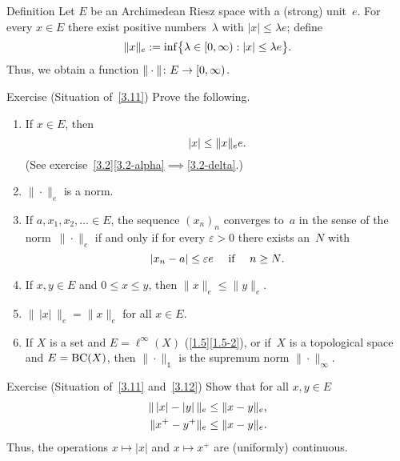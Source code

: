 \documentclass[main.tex]{subfiles}
\begin{document}
%
%
\begin{psec}{3.11}{Definition}
Let $E$ be an Archimedean Riesz space
with a (strong) unit~$e$.
For every $x\in E$
there exist positive numbers~$\lambda$
with $|x|\leq \lambda e$;
define
\begin{equation*}
\| x \|_e := \inf\bigl\{ \lambda\in[0,\infty): |x|\leq \lambda e\bigr\}\text{.}
\end{equation*}
Thus, we obtain a function $\|\cdot\|\colon E \rightarrow [0,\infty)$.
\end{psec}
%
%
\begin{psec}{3.12}{Exercise}
(Situation of~\ref{3.11}) Prove the following.
\begin{enumerate}
\item \label{3.12-1}
If $x\in E$, then 
\begin{equation*}
|x|\leq \|x\|_e e\text{.}
\end{equation*}
(See exercise~\ref{3.2}\ref{3.2-alpha}$\implies$\ref{3.2-delta}.)
%
\item \label{3.12-2}
$\|\cdot\|_e$ is a norm.
%
\item \label{3.12-3}
If $a,x_1,x_2,\dotsc\in E$,
the sequence $(x_n)_n$
converges to~$a$ in the sense
of the norm~$\|\cdot\|_e$
if and only if 
for every $\varepsilon>0$ there exists 
an~$N$ with
\begin{equation*}
|x_n-a|\leq \varepsilon e \quad\text{ if }\quad n\geq N\text{.} 
\end{equation*}
%
\item \label{3.12-4}
If $x,y\in E$ and $0\leq x\leq y$,
then $\|x\|_e \leq \|y\|_e$.
%
\item \label{3.12-5}
$\| \, | x|\, \|_e=\| x \|_e$ for all $x\in E$.
%
\item \label{3.12-6}
If $X$ is a set and $E=\ell^\infty(X)$
(\ref{1.5}\ref{1.5-2}),
or if~$X$ is a topological space 
and $E=\mathrm{BC}(X)$,
then $\|\cdot\|_\mathbb{1}$ 
is the supremum norm $\|\cdot\|_\infty$.
\end{enumerate}
\end{psec}
%
%
\begin{psec}{3.13}{Exercise}
(Situation of~\ref{3.11} and~\ref{3.12})
Show that for all $x,y\in E$
\begin{align*}
\|\,|x|-|y|\,\|_e & \leq \|x-y\|_e\text{,}\\
\| x^+ - y^+ \|_e & \leq \|x-y\|_e\text{.}
\end{align*}
Thus, the operations $x\mapsto |x|$
and $x\mapsto x^+$
are (uniformly) continuous.
\end{psec}
\end{document}
